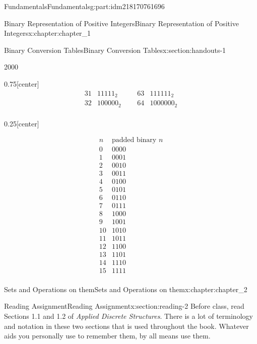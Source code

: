 \documentclass[oneside,10pt,]{book}
\numberwithin{equation}{section}
\begin{document}
\begin{partptx}{Fundamentals}{}{Fundamentals}{}{}{g:part:idm218170761696}
\begin{chapterptx}{Binary Representation of Positive Integers}{}{Binary Representation of Positive Integers}{}{}{x:chapter:chapter_1}
\begin{sectionptx}{Binary Conversion Tables}{}{Binary Conversion Tables}{}{}{x:section:handouts-1}
\begin{sidebyside}{2}{0}{0}{0}
\begin{sbspanel}{0.75}[center]
\begin{equation*}
\begin{array}{ccccc}
31 & 11111_2 & \text{     } &
63 & 111111_2 \\
32 & 100000_2 & \text{     }
& 64 & 1000000_2 \\
\end{array}
\end{equation*}
%
\end{sbspanel}%
\begin{sbspanel}{0.25}[center]%
\par
%
\begin{equation*}
\begin{array}{cc}
n & \text{padded
binary } n \\
0 & 0000 \\
1 & 0001 \\
2 & 0010 \\
3 & 0011 \\
4 & 0100 \\
5 & 0101 \\
6 & 0110 \\
7 & 0111 \\
8 & 1000 \\
9 & 1001 \\
10 & 1010 \\
11 & 1011 \\
12 & 1100 \\
13 & 1101 \\
14 & 1110 \\
15 & 1111 \\
\end{array}
\end{equation*}
%
\end{sbspanel}%
\end{sidebyside}%
\end{sectionptx}
\end{chapterptx}
%
\typeout{************************************************}
\typeout{************************************************}
%
\begin{chapterptx}{Sets and Operations on them}{}{Sets and Operations on them}{}{}{x:chapter:chapter_2}
%
%
%
\typeout{************************************************}
\typeout{************************************************}
%
\begin{sectionptx}{Reading Assignment}{}{Reading Assignment}{}{}{x:section:reading-2}
Before class, read Sections 1.1 and 1.2 of \emph{Applied Discrete Structures}. There is a lot of terminology and notation in these two sections that is used throughout the book. Whatever aids you personally use to remember them, by all means use them.%

\end{sectionptx}
\end{chapterptx}
\end{partptx}
\end{document}
